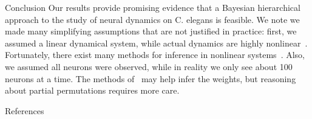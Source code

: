 \documentclass[final]{beamer}
\begin{document}
\begin{frame}[allowframebreaks]
\begin{minipage}[htp][1\textheight][t]{\textwidth}
\begin{columns}[t]
\begin{column}{.5\linewidth}
\begin{block}{Conclusion}
Our results provide promising evidence that a Bayesian hierarchical
approach to the study of neural dynamics on C. elegans is feasible. We
note we made many simplifying assumptions that are not justified in
practice: first, we assumed a linear dynamical system, while actual
dynamics are highly nonlinear~\citep{Kato2015}. Fortunately, there
exist many methods for inference in nonlinear
systems~\citep{Krishnan2015, linderman2017bayesian}. Also, we assumed
all neurons were observed, while in reality we only see about 100
neurons at a time. The methods of~\citet{Soudry2015} may help
infer the weights, but reasoning about partial permutations requires
more care. 
	\end{block}


   
	     \begin{block}{References}
	     \tiny
		



	\end{block}
	     	   		     

	     \end{column}
	     
            
            
            
	\end{columns}
      \end{minipage}
      
       
       

      
\end{frame}
\end{document}
